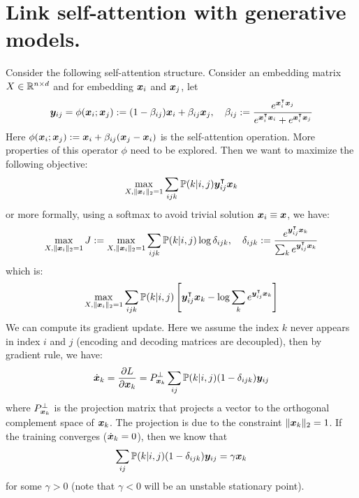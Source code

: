 \section{Link self-attention with generative models.}
Consider the following self-attention structure. Consider an embedding matrix $X\in \mathbb{R}^{n\times d}$ and for embedding ${\bm{x}}_i$ and ${\bm{x}}_j$, let
\begin{equation}
    {\bm{y}}_{ij} = \phi({\bm{x}}_i; {\bm{x}}_j) := (1 - \beta_{ij}){\bm{x}}_i + \beta_{ij} {\bm{x}}_j, \quad \beta_{ij} := \frac{e^{{\bm{x}}_i^\intercal {\bm{x}}_j}}{e^{{\bm{x}}_i^\intercal {\bm{x}}_i} + e^{{\bm{x}}_i^\intercal {\bm{x}}_j}} \\ 
\end{equation}
Here $\phi({\bm{x}}_i;{\bm{x}}_j) := {\bm{x}}_i + \beta_{ij}({\bm{x}}_j-{\bm{x}}_i)$ is the self-attention operation. More properties of this operator $\phi$ need to be explored. Then we want to maximize the following objective:
\begin{equation}
    \max_{X, \|{\bm{x}}_i\|_2=1} \sum_{ijk} \mathbb{P}(k|i,j) {\bm{y}}^\intercal_{ij} {\bm{x}}_k 
\end{equation}
or more formally, using a softmax to avoid trivial solution ${\bm{x}}_i \equiv {\bm{x}}$, we have:
\begin{equation}
    \max_{X, \|{\bm{x}}_i\|_2=1} J := \max_{X, \|{\bm{x}}_i\|_2=1} \sum_{ijk} \mathbb{P}(k|i,j) \log\delta_{ijk}, \quad \delta_{ijk} := \frac{e^{{\bm{y}}^\intercal_{ij} {\bm{x}}_k}}{\sum_k e^{{\bm{y}}^\intercal_{ij} {\bm{x}}_k}} 
\end{equation}
which is:
\begin{equation}
    \max_{X, \|{\bm{x}}_i\|_2=1} \sum_{ijk} \mathbb{P}(k|i,j) \left[{\bm{y}}^\intercal_{ij} {\bm{x}}_k - \log \sum_k e^{{\bm{y}}^\intercal_{ij} {\bm{x}}_k} \right] 
\end{equation}
We can compute its gradient update. Here we assume the index $k$ never appears in index $i$ and $j$ (encoding and decoding matrices are decoupled), then by gradient rule, we have:
\begin{equation}
    \dot {{\bm{x}}}_k = \frac{\partial L}{\partial {\bm{x}}_k} = P^\perp_{{\bm{x}}_k} \sum_{ij} \mathbb{P}(k|i,j) (1 - \delta_{ijk}) {\bm{y}}_{ij}
\end{equation}
where $P^{\perp}_{{\bm{x}}_k}$ is the projection matrix that projects a vector to the orthogonal complement space of ${\bm{x}}_k$. The projection is due to the constraint $\|{\bm{x}}_k\|_2=1$. If the training converges ($\dot {{\bm{x}}}_k = 0$), then we know that 
\begin{equation}
    \sum_{ij} \mathbb{P}(k|i,j) (1 - \delta_{ijk}) {\bm{y}}_{ij} = \gamma {\bm{x}}_k
\end{equation}
for some $\gamma > 0$ (note that $\gamma < 0$ will be an unstable stationary point).  

